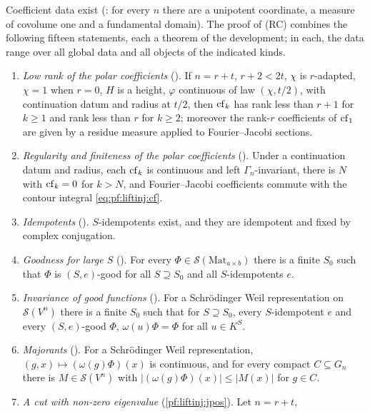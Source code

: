 Coefficient data exist (: for every $n$ there are a unipotent coordinate, a
measure of covolume one and a fundamental domain). The proof of (RC) combines the following fifteen statements, each a theorem of the development;
in each, the data range over all global data and all objects of the indicated kinds.
\begin{enumerate}[label=(R\arabic*)]
\item\label{pf:liftinj:R1} \emph{Low rank of the polar coefficients} (). If $n=r+t$, $r+2<2t$, $\chi$ is
$r$-adapted, $\chi=1$ when $r=0$, $H$ is a height, $\varphi$ continuous of law $(\chi,t/2)$, with continuation datum and radius at $t/2$, then
$\operatorname{cf}_k$ has rank less than $r+1$ for $k\ge1$ and rank less than $r$ for $k\ge2$; moreover the rank-$r$ coefficients of $\operatorname{cf}_1$
are given by a residue measure applied to Fourier--Jacobi sections.
\item\label{pf:liftinj:R2} \emph{Regularity and finiteness of the polar coefficients} (). Under a
continuation datum and radius, each $\operatorname{cf}_k$ is continuous and left $\Gamma_n$-invariant, there is $N$ with $\operatorname{cf}_k=0$ for $k>N$,
and Fourier--Jacobi coefficients commute with the contour integral \eqref{eq:pf:liftinj:cf}.
\item\label{pf:liftinj:R3} \emph{Idempotents} (). $S$-idempotents exist, and they are idempotent
and fixed by complex conjugation.
\item\label{pf:liftinj:R4} \emph{Goodness for large $S$} (). For every
$\Phi\in\mathcal S(\mathrm{Mat}_{a\times b})$ there is a finite $S_0$ such that $\Phi$ is $(S,e)$-good for all $S\supseteq S_0$ and all
$S$-idempotents $e$.
\item\label{pf:liftinj:R5} \emph{Invariance of good functions} (). For a Schr\"odinger Weil
representation on $\mathcal S(V^n)$ there is a finite $S_0$ such that for $S\supseteq S_0$, every $S$-idempotent $e$ and every $(S,e)$-good
$\Phi$, $\omega(u)\Phi=\Phi$ for all $u\in K^S$.
\item\label{pf:liftinj:R6} \emph{Majorants} (). For a Schr\"odinger Weil representation,
$(g,x)\mapsto(\omega(g)\Phi)(x)$ is continuous, and for every compact $C\subseteq G_n$ there is $M\in\mathcal S(V^n)$ with
$|(\omega(g)\Phi)(x)|\le|M(x)|$ for $g\in C$.
\item\label{pf:liftinj:R7} \emph{A cut with non-zero eigenvalue} (\cref{pf:liftinj:jpos}). Let $n=r+t$,

\end{enumerate}
